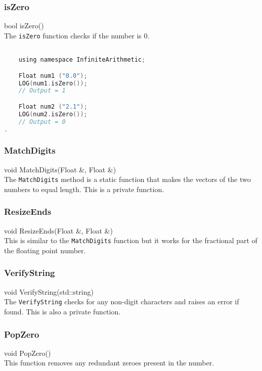 \subsubsection{isZero}
{\ttfamily \large bool isZero()} \\[2mm]
The \verb|isZero| function checks if the number is $0$.
\vspace*{1em}
\begin{lstlisting}[language = C]

	using namespace InfiniteArithmetic;

	Float num1 ("0.0");
	LOG(num1.isZero());
	// Output = 1

	Float num2 ("2.1");
	LOG(num2.isZero());
	// Output = 0
.
\end{lstlisting}
\vspace*{1em}


\subsubsection{MatchDigits}
{\ttfamily \large void MatchDigits(Float \&, Float \&)} \\[2mm]
The \verb|MatchDigits| method is a static function that makes the vectors of the two numbers to equal length. This is a private function.

\subsubsection{ResizeEnds}
{\ttfamily \large void ResizeEnds(Float \&, Float \&)} \\[2mm]
This is similar to the \verb|MatchDigits| function but it works for the fractional part of the floating point number.

\subsubsection{VerifyString}
{\ttfamily \large void VerifyString(std::string)} \\[2mm]
The \verb|VerifyString| checks for any non-digit characters and raises an error if found. This is also a private function.

\subsubsection{PopZero}
{\ttfamily \large void PopZero()} \\[2mm]
This function removes any redundant zeroes present in the number.